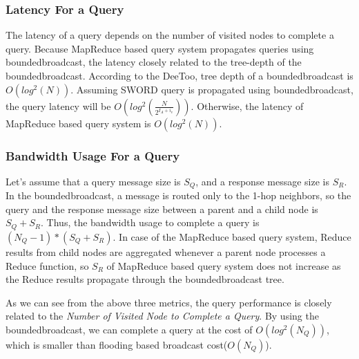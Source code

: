 \documentclass{acm_proc_article-sp}
\begin{document}
\subsubsection{Latency For a Query}
The latency of a query depends on the number of visited nodes to complete a query. Because MapReduce based query system propagates queries using boundedbroadcast, the latency closely related to
the tree-depth of the boundedbroadcast. According to the DeeToo\cite{deetoo}, tree depth of a boundedbroadcast is \begin{math}O(log^2(N))\end{math}. Assuming SWORD query is propagated using boundedbroadcast,
the query latency will be  \begin{math}O(log^2(\frac{N}{2^{I_A+i_v}}))\end{math}. Otherwise, the latency of MapReduce based query system is  \begin{math}O(log^2(N))\end{math}.
\subsubsection{Bandwidth Usage For a Query}
Let's assume that a query message size is $S_Q$, and a response message size is $S_R$.
In the boundedbroadcast, a message is routed only to the 1-hop neighbors, so the query and the response message size between a parent and a child node is $S_Q+S_R$.
Thus, the bandwidth usage to complete a query is \begin{math}(N_Q-1)*(S_Q+S_R)\end{math}.
In case of the MapReduce based query system, Reduce results from child nodes are aggregated whenever a parent node processes a Reduce function, so $S_R$ of MapReduce based query system does not increase
as the Reduce results propagate through the boundedbroadcast tree.

As we can see from the above three metrics, the query performance is closely related to the \textit{Number of Visited Node to Complete a Query}. By using the boundedbroadcast, we can complete a query
at the cost of \begin{math}O(log^2(N_Q))\end{math}, which is smaller than flooding based broadcast cost(\begin{math}O(N_Q)\end{math}).
\end{document}
